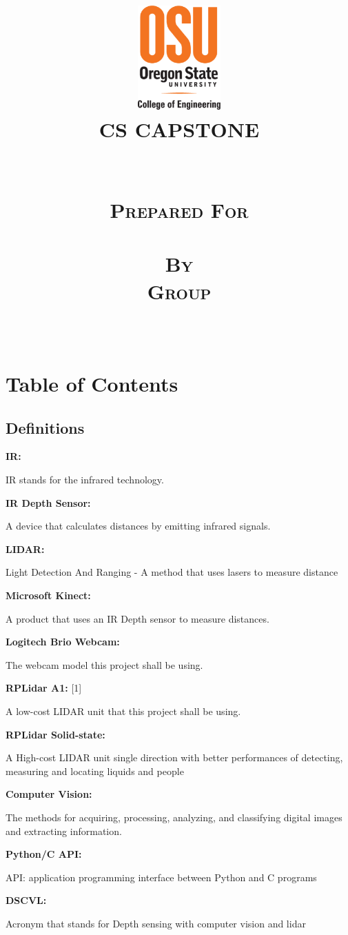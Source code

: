 \documentclass[onecolumn, draftclsnofoot,10pt, compsoc]{IEEEtran}
\date{\displaydate{date}}
\title{\centering
			\includegraphics[height=4cm,natwidth=200,natheight=300]{images/osu_logo.eps}\\\vspace{.5in}
		\scshape{\huge CS CAPSTONE \DocType \\\vspace{.5in}
		\textbf{\Huge\CapstoneProjectName}\\\vspace{1in}
		\large	\displaydate{date}\\\vspace{.3in}		
			\large {Prepared For}\\\vspace{.1in}
			\textbf{{\Large \CapstoneSponsorPerson}} \\\vspace{.6in}		
				\large {By} \\\vspace{.1in}
				\textbf {Group \CapstoneTeamNumber}\\\vspace{.1in}
				\large {\CapstoneTeamName}\\\vspace{.1in}
				\textbf{ { \GroupMemberTwo}}
}  
}
\begin{document}
\maketitle
\IEEEdisplaynontitleabstractindextext
\IEEEpeerreviewmaketitle
\newpage
{}
\tableofcontents
\newpage
	
\section{Table of Contents}
\tableofcontents




 
\begin{singlespace}
	\section{Definitions}
			\textbf{IR: }\label{def:IR}\par
		IR stands for the infrared technology.

		\textbf{IR Depth Sensor: }\label{def:depthsensor}\par
		A device that calculates distances by emitting infrared signals. 
		
		\textbf{LIDAR: }\label{def:lidar}\par
		Light Detection And Ranging - A method that uses lasers to measure distance
		
		\textbf{Microsoft Kinect: }\label{def:kinect}\par
		A product that uses an IR Depth sensor to measure distances.
		
		\textbf{Logitech Brio Webcam: }\label{def:brio}\cite{logitech}\par
		The webcam model this project shall be using.
		
		\textbf{RPLidar A1: }\label{def:rplidar}[1]\cite{slamtec}\par
		A low-cost LIDAR unit that this project shall be using.
		
		\textbf{RPLidar Solid-state: }\label{def:rplidar2}\cite{leddartech}\par
		A High-cost LIDAR unit single direction with better performances of detecting, measuring and locating liquids and people
	 	
		
		\textbf{Computer Vision: }\label{def:vision}\par
		The methods for acquiring, processing, analyzing, and classifying digital images and extracting information.
		
		
		
		\textbf{Python/C API: }\label{def:API}\cite{Ctype}\par
		API: application programming interface between Python and C programs
		
		\textbf{DSCVL: }\label{def:DSCVL}\par
		Acronym that stands for Depth sensing with computer vision and lidar

\end{singlespace}
\end{document}

